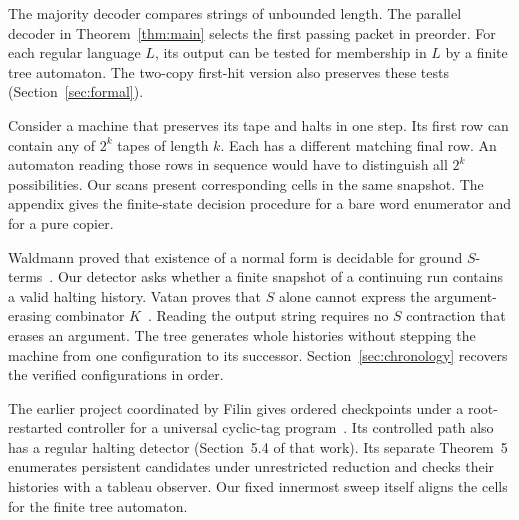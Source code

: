 The majority decoder compares strings of unbounded length. The parallel decoder in Theorem~\ref{thm:main} selects the first passing packet in preorder. For each regular language $L$, its output can be tested for membership in $L$ by a finite tree automaton. The two-copy first-hit version also preserves these tests (Section~\ref{sec:formal}).

Consider a machine that preserves its tape and halts in one step. Its first row can contain any of $2^k$ tapes of length $k$. Each has a different matching final row. An automaton reading those rows in sequence would have to distinguish all $2^k$ possibilities. Our scans present corresponding cells in the same snapshot. The appendix gives the finite-state decision procedure for a bare word enumerator and for a pure copier.

Waldmann proved that existence of a normal form is decidable for ground $S$-terms~\cite{waldmann}. Our detector asks whether a finite snapshot of a continuing run contains a valid halting history. Vatan proves that $S$ alone cannot express the argument-erasing combinator $K$~\cite{vatan}. Reading the output string requires no $S$ contraction that erases an argument. The tree generates whole histories without stepping the machine from one configuration to its successor. Section~\ref{sec:chronology} recovers the verified configurations in order.

The earlier project coordinated by Filin gives ordered checkpoints under a root-restarted controller for a universal cyclic-tag program~\cite[Theorem~1R and Corollary~2.2]{filin}. Its controlled path also has a regular halting detector (Section~5.4 of that work). Its separate Theorem~5 enumerates persistent candidates under unrestricted reduction and checks their histories with a tableau observer. Our fixed innermost sweep itself aligns the cells for the finite tree automaton.
